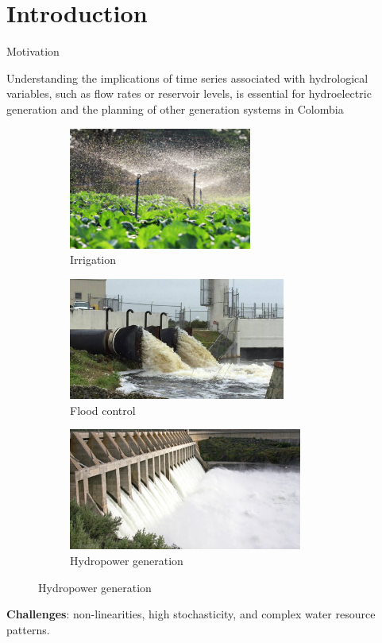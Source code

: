 \section{Introduction}
\begin{frame}{Motivation}
	
	Understanding the implications of time series associated with hydrological variables, such as flow rates or reservoir levels, is essential for hydroelectric generation and the planning of other generation systems in Colombia
	
	\begin{figure}
		\centering
		\begin{subfigure}[b]{0.3\textwidth}
			\centering
			\includegraphics[width=\textwidth, height=4cm]{images/irrigation.jpg}
			\caption{Irrigation}
		\end{subfigure}
		\hfill
		\begin{subfigure}[b]{0.3\textwidth}
			\centering
			\includegraphics[width=\textwidth, height=4cm]{images/flood_control.jpeg}
			\caption{Flood control}
		\end{subfigure}
		\hfill
		\begin{subfigure}[b]{0.3\textwidth}
			\centering
			\includegraphics[width=\textwidth, height=4cm]{images/hydro_gen.jpeg}
			\caption{Hydropower generation}
		\end{subfigure}
		
	\end{figure}
	\textcolor{myNewColorB}{\textbf{Challenges}}: non-linearities, high stochasticity, and complex water resource patterns.
	
\end{frame}

